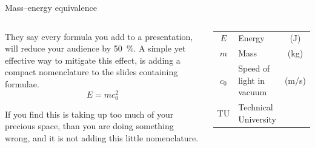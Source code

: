\begin{frame}{Mass--energy equivalence}
  \begin{columns}[T]
    \begin{textcolumn}
      They say every formula you add to a presentation, will reduce your audience
      by \SI{50}{\percent}. A simple yet effective way to mitigate this effect,
      is adding a compact nomenclature to the slides containing formulae.
      \[E=mc_0^2\]
      
      If you find this is taking up too much of your precious space,
      than you are doing something wrong, and it is not adding this little nomenclature.
      
    \end{textcolumn}
    \begin{textcolumn}
      \color{white}
      \begin{tabular}{cp{7em}c}
        $E$ & Energy & (\unit{J}) \\
        $m$ & Mass & (\unit{kg}) \\
        $c_0$ & Speed of light in vacuum & (\unit{m/s})\\
        TU &  Technical University
      \end{tabular}
    \end{textcolumn}
  \end{columns}
\end{frame}


\setlength{\splitpos}{-0.3\paperwidth}

